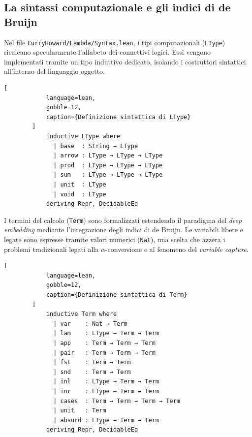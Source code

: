 \subsection{La sintassi computazionale e gli indici di de Bruijn}
Nel file \texttt{CurryHoward/Lambda/Syntax.lean}, i tipi computazionali (\texttt{LType}) ricalcano specularmente l'alfabeto dei connettivi logici. Essi vengono implementati tramite 
un tipo induttivo dedicato, isolando i costruttori sintattici all'interno del linguaggio oggetto.
\begin{center}
    \begin{minipage}{\textwidth}
        \begin{lstlisting}[
            language=lean, 
            gobble=12,
            caption={Definizione sintattica di LType}
        ]
            inductive LType where
              | base  : String → LType
              | arrow : LType → LType → LType
              | prod  : LType → LType → LType
              | sum   : LType → LType → LType
              | unit  : LType
              | void  : LType
            deriving Repr, DecidableEq
        \end{lstlisting}
    \end{minipage}
\end{center}
I termini del calcolo (\texttt{Term}) sono formalizzati estendendo il paradigma del \emph{deep embedding} mediante l'integrazione degli indici di de Bruijn. Le variabili libere e legate 
sono espresse tramite valori numerici (\texttt{Nat}), una scelta che azzera i problemi tradizionali legati alla $\alpha$-conversione e al fenomeno del \emph{variable capture}.
\begin{center}
    \begin{minipage}{\textwidth}
        \begin{lstlisting}[
            language=lean, 
            gobble=12,
            caption={Definizione sintattica di Term}
        ]
            inductive Term where
              | var    : Nat → Term
              | lam    : LType → Term → Term
              | app    : Term → Term → Term
              | pair   : Term → Term → Term
              | fst    : Term → Term
              | snd    : Term → Term
              | inl    : LType → Term → Term
              | inr    : LType → Term → Term
              | cases  : Term → Term → Term → Term
              | unit   : Term
              | absurd : LType → Term → Term
            deriving Repr, DecidableEq
        \end{lstlisting}
    \end{minipage}
\end{center}


